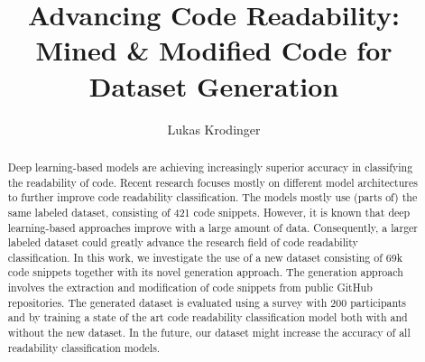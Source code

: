 \documentclass[%
class=scrreprt,
chapterprefix=false,%
open=right,%
twoside=false,%
paper=a4,%
logofile={Logo\_zentral\_farbig\_EN.png},%
thesistype=master,%
UKenglish,%
]{se2thesis}
\author{Lukas Krodinger}
\title{Advancing Code Readability: Mined \& Modified Code for Dataset Generation}
\institute{Chair of Software Engineering II}
\theoremstyle{definition}
\newcommand{\numSamples}{69k }
\begin{document}
	
	\frontmatter
	
	\maketitle
	
	\begin{abstract}
		
		
		Deep learning-based models are achieving increasingly superior accuracy in classifying the readability of code.
		Recent research focuses mostly on different model architectures to further improve code readability classification. The models mostly use (parts of) the same labeled dataset, consisting of 421 code snippets.
		However, it is known that deep learning-based approaches improve with a large amount of data.
		Consequently, a larger labeled dataset could greatly advance the research field of code readability classification.
		In this work, we investigate the use of a new dataset consisting of \numSamples code snippets together with its novel generation approach.
		The generation approach involves the extraction and modification of code snippets from public GitHub repositories. The generated dataset is evaluated using a survey with 200 participants and by training a state of the art code readability classification model both with and without the new dataset.
		In the future, our dataset might increase the accuracy of all readability classification models.
		

	\end{abstract}
	
\end{document}
